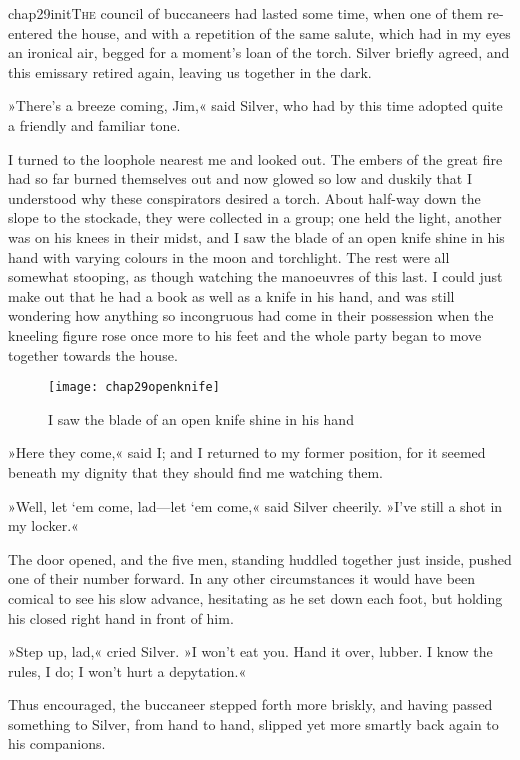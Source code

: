 
   \lettrine[lines=4,image=true]{chap29initT}{he} council of buccaneers had lasted some time, when one of them re-entered the house, and with a repetition of the same salute, which had in my eyes an ironical air, begged for a moment's loan of the torch. Silver briefly agreed, and this emissary retired again, leaving us together in the dark.

»There's a breeze coming, Jim,« said Silver, who had by this time adopted quite a friendly and familiar tone.

I turned to the loophole nearest me and looked out. The embers of the great fire had so far burned themselves out and now glowed so low and duskily that I understood why these conspirators desired a torch. About half-way down the slope to the stockade, they were collected in a group; one held the light, another was on his knees in their midst, and I saw the blade of an open knife shine in his hand with varying colours in the moon and torchlight. The rest were all somewhat stooping, as though watching the manoeuvres of this last. I could just make out that he had a book as well as a knife in his hand, and was still wondering how anything so incongruous had come in their possession when the kneeling figure rose once more to his feet and the whole party began to move together towards the house.

\begin{figure}[p]
\centering
\texttt{[image: chap29openknife]}
\caption{I saw the blade of an open knife shine in his hand}
\end{figure} 

»Here they come,« said I; and I returned to my former position, for it seemed beneath my dignity that they should find me watching them.

»Well, let `em come, lad—let `em come,« said Silver cheerily. »I've still a shot in my locker.«

The door opened, and the five men, standing huddled together just inside, pushed one of their number forward. In any other circumstances it would have been comical to see his slow advance, hesitating as he set down each foot, but holding his closed right hand in front of him.

»Step up, lad,« cried Silver. »I won't eat you. Hand it over, lubber. I know the rules, I do; I won't hurt a depytation.«

Thus encouraged, the buccaneer stepped forth more briskly, and having passed something to Silver, from hand to hand, slipped yet more smartly back again to his companions.

